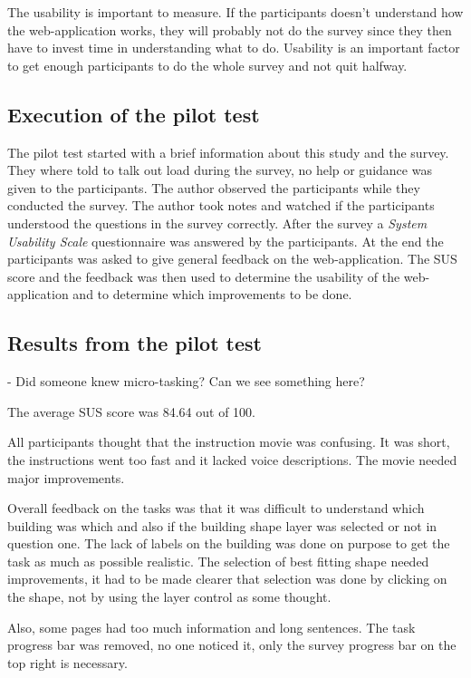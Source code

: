 The usability is important to measure. If the participants doesn't understand how the web-application works, they will probably not do the survey since they then have to invest time in understanding what to do. %
Usability is an important factor to get enough participants to do the whole survey and not quit halfway. 

\subsection{Execution of the pilot test}
The pilot test started with a brief information about this study and the survey. They where told to talk out load during the survey, no help or guidance was given to the participants. The author observed the participants while they conducted the survey. The author took notes and watched if the participants understood the questions in the survey correctly. After the survey a \textit{System Usability Scale} questionnaire was answered by the participants. At the end the participants was asked to give general feedback on the web-application. The SUS score and the feedback was then used to determine the usability of the web-application and to determine which improvements to be done.  

\subsection{Results from the pilot test}

- Did someone knew micro-tasking? Can we see something here?

The average SUS score was 84.64 out of 100. 

All participants thought that the instruction movie was confusing. It was short, the instructions went too fast and it lacked voice descriptions. The movie needed major improvements. 

Overall feedback on the tasks was that it was difficult to understand which building was which and also if the building shape layer was selected or not in question one. The lack of labels on the building was done on purpose to get the task as much as possible realistic. The selection of best fitting shape needed improvements, it had to be made clearer that selection was done by clicking on the shape, not by using the layer control as some thought. 
 
Also, some pages had too much information and long sentences. The task progress bar was removed, no one noticed it, only the survey progress bar on the top right is necessary. 


